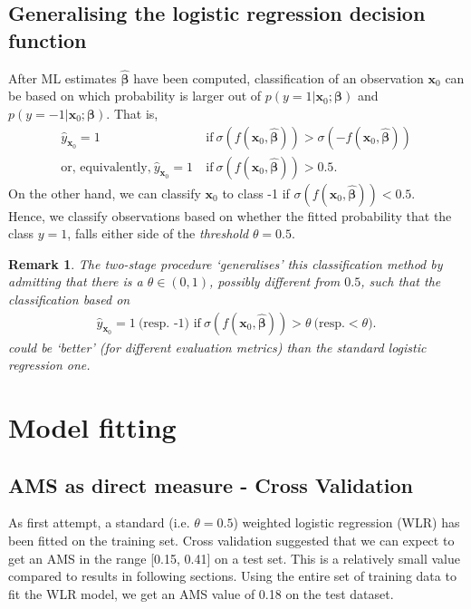 \documentclass[]{article}
\newcommand{\x}{\mathbf{x}}
\newcommand{\bbeta}{\boldsymbol \beta}
\newtheorem{remark}[theorem]{Remark}
\begin{document}
\subsection{Generalising the logistic regression decision function}
\label{app:decision function}

After ML estimates $\hat{\bbeta}$ have been computed, classification of an observation $\x_0$ can be based on which probability is larger out of $p(y=1|\x_0;\bbeta)$ and $p(y=-1|\x_0;\bbeta)$. That is,
\begin{align*}
\hat{y}_{\x_0}=1 \ &\text{if} \ \sigma(f(\x_0,\hat{\bbeta}))>\sigma(-f(\x_0,\hat{\bbeta})) \\
\text{or, equivalently,} \
\hat{y}_{\x_0}=1  \ &\text{if} \ \sigma(f(\x_0,\hat{\bbeta}))> 0.5.
\end{align*} 
On the other hand, we can classify $\x_0$ to class -1 if $\sigma(f(\x_0,\hat{\bbeta}))< 0.5$. \\

\noindent Hence, we classify observations based on whether the fitted probability that the class $y=1$, falls either side of the \textit{threshold} $\theta = 0.5$.

\begin{remark}
The two-stage procedure `generalises' this classification method by admitting that there is a $\theta\in (0,1)$, possibly different from $0.5$, such that the classification based on 
\begin{align*}
\hat{y}_{\x_0}=1 \ \text{(resp. -1) if}\ \sigma(f(\x_0,\hat{\bbeta}))> \theta \  \text{(resp.} <\theta).
\end{align*}
could be `better' (for different evaluation metrics) than the standard logistic regression one. 
\end{remark}


\section{Model fitting}

\subsection{AMS as direct measure - Cross Validation}

As first attempt, a standard (i.e. $\theta=0.5$) weighted logistic regression (WLR) has been fitted on the training set. Cross validation suggested that we can expect to get an AMS in the range [0.15, 0.41] on a test set. This is a relatively small value compared to results in following sections. Using the entire set of training data to fit the WLR model, we get an AMS value of 0.18 on the test dataset.
\end{document}
